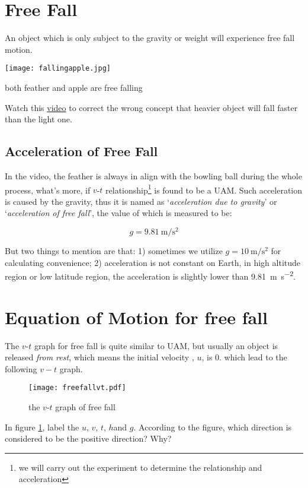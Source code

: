 \documentclass[a4paper]{tufte-handout}
\newenvironment{TaskBox} %
{\begin{tcolorbox}[breakable,colback=b1!30,colframe=b1,title=Task]} {\end{tcolorbox}}
\newenvironment{SummBox}
{\begin{tcolorbox}[breakable,colback=r1!30,colframe=r1,title=Summary]} {\end{tcolorbox}}
\begin{document}
\section{Free Fall}
An object which is only subject to the gravity or weight will experience free fall motion.
\begin{marginfigure}
\texttt{[image: fallingapple.jpg]}
\caption{both feather and apple are free falling}
\end{marginfigure}
Watch this \href{https://www.bilibili.com/video/BV1YW411t76q}{video} to correct the wrong concept that heavier object will fall faster than the light one.

\subsection{Acceleration of Free Fall}
In the video, the feather is always in align with the bowling ball during the whole process, what's more, if $v$-$t$ relationship\footnote{we will carry out the experiment to determine the relationship and acceleration}  is found to be a UAM. Such acceleration is caused by the gravity, thus it is named as `\emph{acceleration due to gravity}' or `\emph{acceleration of free fall}', the value of which is measured to be:
\begin{SummBox}
\[
	g = \SI{9.81}{\m\per\square\second}
\]
\end{SummBox}
But two things to mention are that: 1) sometimes we utilize $g=\SI{10}{\m\per\square\second}$ for calculating convenience; 2) acceleration is not constant on Earth, in high altitude region or low latitude region, the acceleration is slightly lower than \SI{9.81}{\m\per\square\second}. 

\section{Equation of Motion for free fall}
The $v$-$t$ graph for free fall is quite similar to UAM, but usually an object is released \emph{from rest}, which means the initial velocity , $u$, is 0. which lead to the following $v-t$ graph.
\begin{figure}[h]
\texttt{[image: freefallvt.pdf]}
\caption{the $v$-$t$ graph of free fall}
\label{fig:freefall vt}
\end{figure}

\begin{TaskBox}
In figure \ref{fig:freefall vt}, label the $u$, $v$, $t$, $h$and $g$. 
\tcblower
According to the figure, which direction is considered to be the positive direction? Why?
\end{TaskBox}
\end{document}
